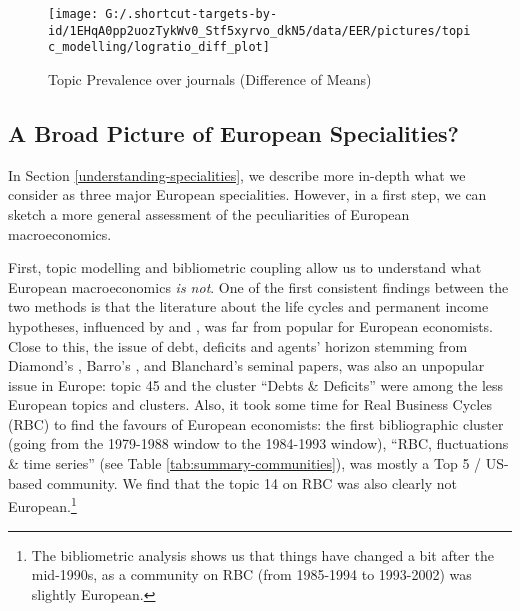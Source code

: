 \documentclass[]{elsarticle} %
\begin{document}
\begin{figure}[h]

{\centering \texttt{[image: G:/.shortcut-targets-by-id/1EHqA0pp2uozTykWv0\_Stf5xyrvo\_dkN5/data/EER/pictures/topic\_modelling/logratio\_diff\_plot]} 

}

\caption{Topic Prevalence over journals (Difference of Means)}\label{fig:plot-topic-diff}
\end{figure}

\hypertarget{a-broad-picture-of-european-specialities}{%
\subsection{A Broad Picture of European
Specialities?}\label{a-broad-picture-of-european-specialities}}

In Section \ref{understanding-specialities}, we describe more in-depth
what we consider as three major European specialities. However, in a
first step, we can sketch a more general assessment of the peculiarities
of European macroeconomics.

First, topic modelling and bibliometric coupling allow us to understand
what European macroeconomics \emph{is not}. One of the first consistent
findings between the two methods is that the literature about the life
cycles and permanent income hypotheses, influenced by
\citet{friedman1957} and \citet{hall1978b}, was far from popular for
European economists. Close to this, the issue of debt, deficits and
agents' horizon stemming from Diamond's \citeyearpar{diamond1965},
Barro's \citeyearpar{barro1974}, and Blanchard's
\citeyearpar{blanchard1985} seminal papers, was also an unpopular issue
in Europe: topic 45 and the cluster ``Debts \& Deficits'' were among the
less European topics and clusters. Also, it took some time for Real
Business Cycles (RBC) to find the favours of European economists: the
first bibliographic cluster (going from the 1979-1988 window to the
1984-1993 window), ``RBC, fluctuations \& time series'' (see Table
\ref{tab:summary-communities}), was mostly a Top 5 / US-based community.
We find that the topic 14 on RBC was also clearly not
European.\footnote{The bibliometric analysis shows us that things have
  changed a bit after the mid-1990s, as a community on RBC (from
  1985-1994 to 1993-2002) was slightly European.}
\end{document}

